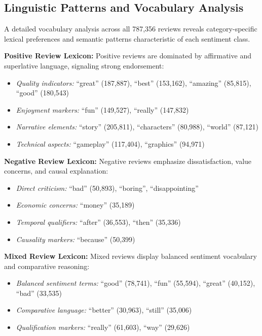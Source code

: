 \subsection{Linguistic Patterns and Vocabulary Analysis}

A detailed vocabulary analysis across all 787{,}356 reviews reveals category-specific lexical preferences and semantic patterns characteristic of each sentiment class.

\textbf{Positive Review Lexicon:}  
Positive reviews are dominated by affirmative and superlative language, signaling strong endorsement:

\begin{itemize}
    \item \textit{Quality indicators:} ``great'' (187{,}887), ``best'' (153{,}162), ``amazing'' (85{,}815), ``good'' (180{,}543)
    \item \textit{Enjoyment markers:} ``fun'' (149{,}527), ``really'' (147{,}832)
    \item \textit{Narrative elements:} ``story'' (205{,}811), ``characters'' (80{,}988), ``world'' (87{,}121)
    \item \textit{Technical aspects:} ``gameplay'' (117{,}404), ``graphics'' (94{,}971)
\end{itemize}

\textbf{Negative Review Lexicon:}  
Negative reviews emphasize dissatisfaction, value concerns, and causal explanation:

\begin{itemize}
    \item \textit{Direct criticism:} ``bad'' (50{,}893), ``boring'', ``disappointing''
    \item \textit{Economic concerns:} ``money'' (35{,}189)
    \item \textit{Temporal qualifiers:} ``after'' (36{,}553), ``then'' (35{,}336)
    \item \textit{Causality markers:} ``because'' (50{,}399)
\end{itemize}

\textbf{Mixed Review Lexicon:}  
Mixed reviews display balanced sentiment vocabulary and comparative reasoning:

\begin{itemize}
    \item \textit{Balanced sentiment terms:} ``good'' (78{,}741), ``fun'' (55{,}594), ``great'' (40{,}152), ``bad'' (33{,}535)
    \item \textit{Comparative language:} ``better'' (30{,}963), ``still'' (35{,}006)
    \item \textit{Qualification markers:} ``really'' (61{,}603), ``way'' (29{,}626)
\end{itemize}

